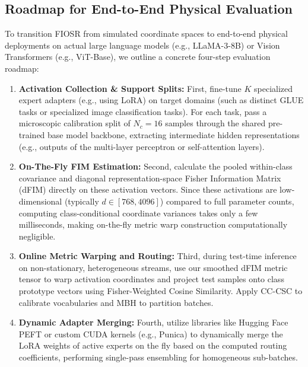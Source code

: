 \subsection{Roadmap for End-to-End Physical Evaluation}
To transition FIOSR from simulated coordinate spaces to end-to-end physical deployments on actual large language models (e.g., LLaMA-3-8B) or Vision Transformers (e.g., ViT-Base), we outline a concrete four-step evaluation roadmap:
\begin{enumerate}\setlength{\itemsep}{0.5pt}\setlength{\parskip}{0pt}
    \item \textbf{Activation Collection \& Support Splits:} First, fine-tune $K$ specialized expert adapters (e.g., using LoRA) on target domains (such as distinct GLUE tasks or specialized image classification tasks). For each task, pass a microscopic calibration split of $N_c=16$ samples through the shared pre-trained base model backbone, extracting intermediate hidden representations (e.g., outputs of the multi-layer perceptron or self-attention layers).
    \item \textbf{On-The-Fly FIM Estimation:} Second, calculate the pooled within-class covariance and diagonal representation-space Fisher Information Matrix (dFIM) directly on these activation vectors. Since these activations are low-dimensional (typically $d \in [768, 4096]$) compared to full parameter counts, computing class-conditional coordinate variances takes only a few milliseconds, making on-the-fly metric warp construction computationally negligible.
    \item \textbf{Online Metric Warping and Routing:} Third, during test-time inference on non-stationary, heterogeneous streams, use our smoothed dFIM metric tensor to warp activation coordinates and project test samples onto class prototype vectors using Fisher-Weighted Cosine Similarity. Apply CC-CSC to calibrate vocabularies and MBH to partition batches.
    \item \textbf{Dynamic Adapter Merging:} Fourth, utilize libraries like Hugging Face PEFT or custom CUDA kernels (e.g., Punica) to dynamically merge the LoRA weights of active experts on the fly based on the computed routing coefficients, performing single-pass ensembling for homogeneous sub-batches.
\end{enumerate}

